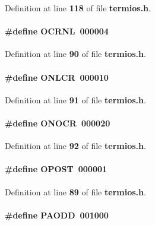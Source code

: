 Definition at line {\bf 118} of file {\bf termios.\+h}.

\paragraph[{O\+C\+R\+NL}]{\setlength{\rightskip}{0pt plus 5cm}\#define O\+C\+R\+NL~000004}\label{termios_8h_adc345d36b46c6ccdd079c9ecc3fc1296}


Definition at line {\bf 90} of file {\bf termios.\+h}.

\paragraph[{O\+N\+L\+CR}]{\setlength{\rightskip}{0pt plus 5cm}\#define O\+N\+L\+CR~000010}\label{termios_8h_a957436bc6db0a0d49b081dc9b4c98ef2}


Definition at line {\bf 91} of file {\bf termios.\+h}.

\paragraph[{O\+N\+O\+CR}]{\setlength{\rightskip}{0pt plus 5cm}\#define O\+N\+O\+CR~000020}\label{termios_8h_aab452deaf5d1b993c3b0ff2d3e408577}


Definition at line {\bf 92} of file {\bf termios.\+h}.

\paragraph[{O\+P\+O\+ST}]{\setlength{\rightskip}{0pt plus 5cm}\#define O\+P\+O\+ST~000001}\label{termios_8h_a0aad4afe9e202fff8ced3485bc835bb1}


Definition at line {\bf 89} of file {\bf termios.\+h}.

\paragraph[{P\+A\+O\+DD}]{\setlength{\rightskip}{0pt plus 5cm}\#define P\+A\+O\+DD~001000}\label{termios_8h_a4a9ab2c54b7bbac4d45038d38a168a74}


